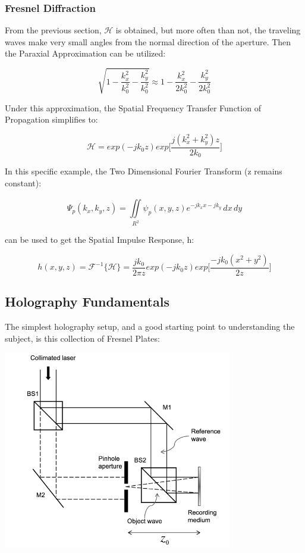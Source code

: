 \documentclass[12pt]{article}
\begin{document}
\subsubsection{Fresnel Diffraction}

From the previous section, \(\mathscr{H}\) is obtained, but more often than not, the traveling waves make very small angles from the normal direction of the aperture. Then the Paraxial Approximation can be utilized:

\begin{equation}
	\sqrt{1 - \frac{k_{x}^2}{k_{0}^2} - \frac{k_{y}^2}{k_0^2}} \approx 1 - \frac{k_{x}^2}{2k_{0}^2} - \frac{k_{y}^2}{2k_{0}^2}
\end{equation}

Under this approximation, the Spatial Frequency Transfer Function of Propagation simplifies to:

\begin{equation}
	\mathscr{H} = exp(-jk_{0}z)exp\bigg[\frac{j(k_{x}^2 + k_{y}^2)z}{2k_{0}}\bigg]
\end{equation}

In this specific example, the Two Dimensional Fourier Transform (z remains constant):

\begin{equation}
	\Psi_{p}(k_{x},k_{y},z) = \iint \limits_{R^2}^{} \psi_{p}(x,y,z)e^{-jk_{x}x - jk_{y}} \,dx\,dy
\end{equation}

can be used to get the Spatial Impulse Response, h:

\begin{equation}
	h(x,y,z) = \mathscr{F}^{-1}\{\mathscr{H}\} = \frac{jk_{0}}{2\pi z} exp(-jk_{0}z)exp\bigg[\frac{-jk_{0}(x^2 + y^2)}{2z}\bigg]
\end{equation}




\subsection{Holography Fundamentals}

The simplest holography setup, and a good starting point to understanding the subject, is this collection of Fresnel Plates:

\begin{center}
	\includegraphics[width=100mm]{tupac7.png}
\end{center}
\end{document}
